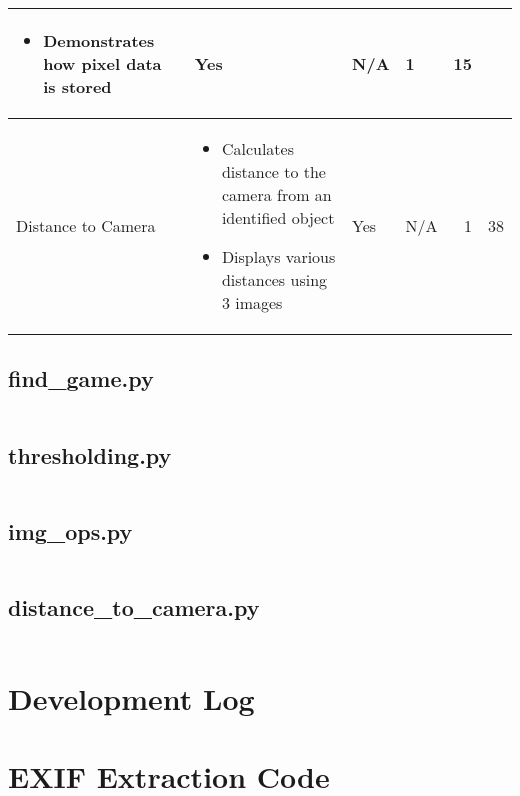 \begin{landscape}
\begin{table}[h!]
\begin{tabular}{|l|p{}|l|p{}|r|r|}
\begin{itemize}[noitemsep,topsep=0pt,parsep=0pt]
						\item{Demonstrates how pixel data is stored}
					\end{itemize}&
					Yes&
					N/A&
					1&
					15\\
					\hline
					Distance to Camera&
					\begin{itemize}[noitemsep,topsep=0pt,parsep=0pt]
						\item{Calculates distance to the camera from an identified object}
						\item{Displays various distances using 3 images}
					\end{itemize}&
					Yes&
					N/A&
					1&
					38\\
					\hline
				\end{tabular}
			\end{table}
		\end{landscape}
		\restoregeometry
		\subsection{find\_game.py}
		\inputminted[breaklines,
						linenos,
						frame=lines,
						fontsize=\footnotesize]{python}{../code/python/find_game.py}
		\subsection{thresholding.py}
		\inputminted[breaklines,
						linenos,
						frame=lines,
						fontsize=\footnotesize]{python}{../code/python/thresholding.py}
		\subsection{img\_ops.py}
		\inputminted[breaklines,
						linenos,
						frame=lines,
						fontsize=\footnotesize]{python}{../code/python/img_ops.py}
		\subsection{distance\_to\_camera.py}
		\inputminted[breaklines,
						linenos,
						frame=lines,
						fontsize=\footnotesize]{python}{../code/python/distance_to_camera.py}
\clearpage
\section{Development Log}\label{app:dev_log}

\section{EXIF Extraction Code}\label{app:exif_code}
	\inputminted[breaklines,
				linenos,
				frame=lines,
				fontsize=\footnotesize,
				firstline=36,
				lastline=63]{python}{../code/program/v2.py}
				
